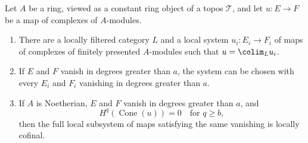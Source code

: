 \begin{lemma}
\label{lemma-illusie-I-local-finite-type-approximation}
Let $A$ be a ring, viewed as a constant ring object of a topos
$\mathcal{T}$, and let $u : E \to F$ be a map of complexes of
$A$-modules.
\begin{enumerate}
\item There are a locally filtered category $L$ and a local system
$u_i : E_i \to F_i$ of maps of complexes of finitely presented $A$-modules
such that $u = \colim_L u_i$.
\item If $E$ and $F$ vanish in degrees greater than $a$, the system can be
chosen with every $E_i$ and $F_i$ vanishing in degrees greater than $a$.
\item If $A$ is Noetherian, $E$ and $F$ vanish in degrees greater than
$a$, and
$$
H^q(\operatorname{Cone}(u)) = 0 \quad\text{for }q \geq b,
$$
then the full local subsystem of maps satisfying the same vanishing is
locally cofinal.
\end{enumerate}
\end{lemma}

